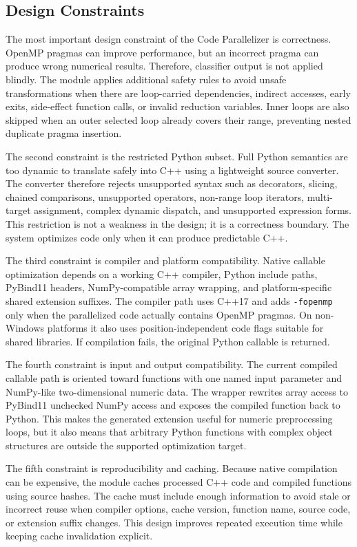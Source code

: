 \subsection{Design Constraints}

The most important design constraint of the Code Parallelizer is correctness.
OpenMP pragmas can improve performance, but an incorrect pragma can produce
wrong numerical results. Therefore, classifier output is not applied blindly.
The module applies additional safety rules to avoid unsafe transformations when
there are loop-carried dependencies, indirect accesses, early exits, side-effect
function calls, or invalid reduction variables. Inner loops are also skipped when
an outer selected loop already covers their range, preventing nested duplicate
pragma insertion.

The second constraint is the restricted Python subset. Full Python semantics are
too dynamic to translate safely into C++ using a lightweight source converter.
The converter therefore rejects unsupported syntax such as decorators, slicing,
chained comparisons, unsupported operators, non-range loop iterators,
multi-target assignment, complex dynamic dispatch, and unsupported expression
forms. This restriction is not a weakness in the design; it is a correctness
boundary. The system optimizes code only when it can produce predictable C++.

The third constraint is compiler and platform compatibility. Native callable
optimization depends on a working C++ compiler, Python include paths, PyBind11
headers, NumPy-compatible array wrapping, and platform-specific shared extension
suffixes. The compiler path uses C++17 and adds \texttt{-fopenmp} only when the
parallelized code actually contains OpenMP pragmas. On non-Windows platforms it
also uses position-independent code flags suitable for shared libraries. If
compilation fails, the original Python callable is returned.

The fourth constraint is input and output compatibility. The current compiled
callable path is oriented toward functions with one named input parameter and
NumPy-like two-dimensional numeric data. The wrapper rewrites array access to
PyBind11 unchecked NumPy access and exposes the compiled function back to
Python. This makes the generated extension useful for numeric preprocessing
loops, but it also means that arbitrary Python functions with complex object
structures are outside the supported optimization target.

The fifth constraint is reproducibility and caching. Because native compilation
can be expensive, the module caches processed C++ code and compiled functions
using source hashes. The cache must include enough information to avoid stale or
incorrect reuse when compiler options, cache version, function name, source code,
or extension suffix changes. This design improves repeated execution time while
keeping cache invalidation explicit.

